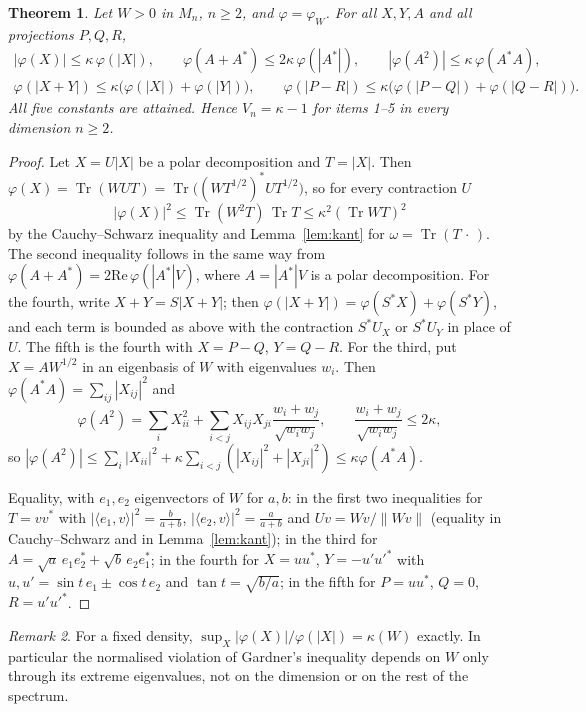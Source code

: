 \documentclass[11pt]{article}
\DeclareMathOperator{\Tr}{Tr}
\renewcommand{\Re}{\mathrm{Re}\,}
\theoremstyle{plain}
\newtheorem{theorem}{Theorem}[section]
\theoremstyle{definition}
\theoremstyle{remark}
\newtheorem{remark}[theorem]{Remark}
\begin{document}
\begin{theorem}\label{thm:kant}
Let $W>0$ in $M_n$, $n\ge2$, and $\varphi=\varphi_W$. For all $X,Y,A$ and all projections $P,Q,R$,
\begin{gather*}
|\varphi(X)|\le\kappa\,\varphi(|X|),\qquad \varphi(A+A^*)\le2\kappa\,\varphi(|A^*|),\qquad |\varphi(A^2)|\le\kappa\,\varphi(A^*A),\\
\varphi(|X+Y|)\le\kappa\bigl(\varphi(|X|)+\varphi(|Y|)\bigr),\qquad
\varphi(|P-R|)\le\kappa\bigl(\varphi(|P-Q|)+\varphi(|Q-R|)\bigr).
\end{gather*}
All five constants are attained. Hence $V_n=\kappa-1$ for items 1--5 in every dimension $n\ge2$.
\end{theorem}
\begin{proof}
Let $X=U|X|$ be a polar decomposition and $T=|X|$. Then $\varphi(X)=\Tr(WUT)=\Tr\bigl((WT^{1/2})^*UT^{1/2}\bigr)$, so for every contraction $U$
\[
  |\varphi(X)|^2\le\Tr(W^2T)\,\Tr T\le\kappa^2(\Tr WT)^2
\]
by the Cauchy--Schwarz inequality and Lemma~\ref{lem:kant} for $\omega=\Tr(T\,\cdot\,)$. The second inequality follows in the same way from
$\varphi(A+A^*)=2\Re\varphi(|A^*|V)$, where $A=|A^*|V$ is a polar decomposition. For the fourth, write $X+Y=S|X+Y|$; then $\varphi(|X+Y|)=\varphi(S^*X)+\varphi(S^*Y)$, and each term
is bounded as above with the contraction $S^*U_X$ or $S^*U_Y$ in place of $U$. The fifth is the fourth with $X=P-Q$,
$Y=Q-R$. For the third, put $X=AW^{1/2}$ in an eigenbasis of $W$ with eigenvalues $w_i$. Then $\varphi(A^*A)=\sum_{ij}|X_{ij}|^2$ and
\[
  \varphi(A^2)=\sum_iX_{ii}^2+\sum_{i<j}X_{ij}X_{ji}\frac{w_i+w_j}{\sqrt{w_iw_j}},\qquad\frac{w_i+w_j}{\sqrt{w_iw_j}}\le2\kappa,
\]
so $|\varphi(A^2)|\le\sum_i|X_{ii}|^2+\kappa\sum_{i<j}(|X_{ij}|^2+|X_{ji}|^2)\le\kappa\varphi(A^*A)$.

Equality, with $e_1,e_2$ eigenvectors of $W$ for $a,b$: in the first two inequalities for $T=vv^*$ with
$|\langle e_1,v\rangle|^2=\frac b{a+b}$, $|\langle e_2,v\rangle|^2=\frac a{a+b}$ and $Uv=Wv/\|Wv\|$ (equality in
Cauchy--Schwarz and in Lemma~\ref{lem:kant}); in the third for $A=\sqrt a\,e_1e_2^*+\sqrt b\,e_2e_1^*$; in the fourth for
$X=uu^*$, $Y=-u'u'^*$ with $u,u'=\sin t\,e_1\pm\cos t\,e_2$ and $\tan t=\sqrt{b/a}$; in the fifth for $P=uu^*$, $Q=0$,
$R=u'u'^*$.
\end{proof}

\begin{remark}
For a fixed density, $\sup_X|\varphi(X)|/\varphi(|X|)=\kappa(W)$ exactly. In particular the normalised violation of
Gardner's inequality depends on $W$ only through its extreme eigenvalues, not on the dimension or on the rest of the
spectrum.
\end{remark}
\end{document}
